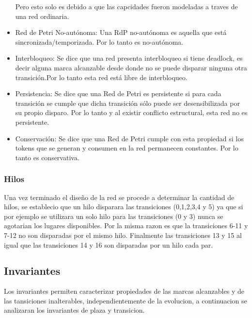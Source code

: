 \documentclass{article}
\begin{document}
\begin{itemize}
		Pero esto solo es debido a que las capcidades fueron modeladas a traves de una red ordinaria.
		\item Red de Petri No-autónoma: Una RdP no-autónoma es aquella que está 
		sincronizada/temporizada. Por lo tanto es no-autónoma.
		\item Interbloqueo: Se dice que una red presenta interbloqueo si tiene deadlock, 
		es decir alguna marca alcanzable desde donde no se puede disparar ninguna otra 
		transición.Por lo tanto esta red está libre de interbloqueo.
		\item Persistencia: Se dice que una Red de Petri es persistente si para cada 
		transición se cumple que dicha transición sólo puede ser desensibilizada por 
		su propio disparo. Por lo tanto y al existir conflicto estructural, esta red 
		no es persistente.
		\item Conservación: Se dice que una Red de Petri cumple con esta propiedad si 
		los tokens que se generan y consumen en la red permanecen constantes. Por lo 
		tanto es conservativa.
	\end{itemize}
	\subsubsection{Hilos}
	Una vez terminado el diseño de la red se procede a determinar la cantidad de hilos, se establecio que un hilo disparara las transiciones (0,1,2,3,4 y 5) ya que si por ejemplo se utilizara un solo hilo para las transiciones (0 y 3) nunca se agotarian los lugares disponibles. Por la misma razon es que la transiciones 6-11 y 7-12 no son disparadas por el mismo hilo. Finalmente las transiciones 13 y 15 al igual que las transiciones 14 y 16 son disparadas por un hilo cada par.
	\subsection{Invariantes}
	Los invariantes permiten caracterizar propiedades de las marcas alcanzables
	y de las tansiciones inalterables, independientemente de la evolucion, a continuacion se analizaran los invariantes de plaza y transicion.
\end{document}
